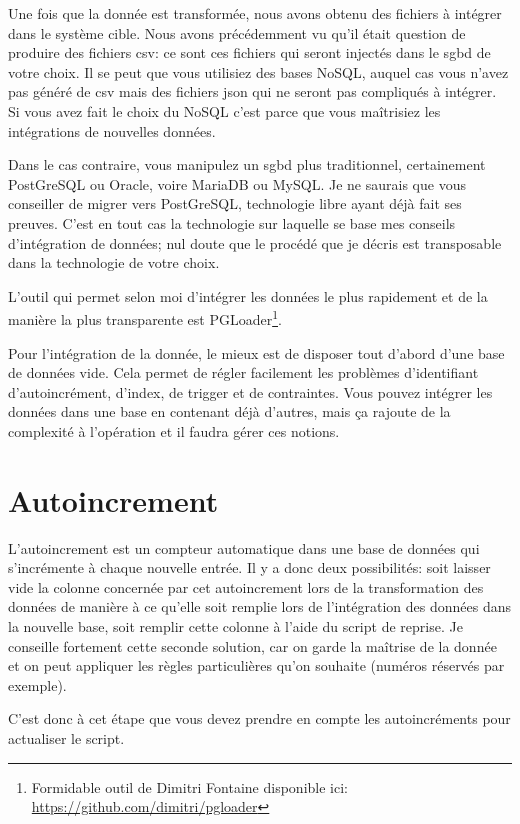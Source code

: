 \documentclass{book}
\begin{document}
Une fois que la donnée est transformée, nous avons obtenu des fichiers à intégrer dans le système cible. Nous avons précédemment vu qu'il était question de produire des fichiers \gls{csv}: ce sont ces fichiers qui seront injectés dans le \gls{sgbd} de votre choix. Il se peut que vous utilisiez des bases NoSQL, auquel cas vous n'avez pas généré de \gls{csv} mais des fichiers \gls{json} qui ne seront pas compliqués à intégrer. Si vous avez fait le choix du NoSQL c'est parce que vous maîtrisiez les intégrations de nouvelles données.

Dans le cas contraire, vous manipulez un \gls{sgbd} plus traditionnel, certainement PostGreSQL ou Oracle, voire MariaDB ou MySQL. Je ne saurais que vous conseiller de migrer vers PostGreSQL, technologie libre ayant déjà fait ses preuves. C'est en tout cas la technologie sur laquelle se base mes conseils d'intégration de données; nul doute que le procédé que je décris est transposable dans la technologie de votre choix.

L'outil qui permet selon moi d'intégrer les données le plus rapidement et de la manière la plus transparente est PGLoader\footnote{Formidable outil de Dimitri Fontaine disponible ici: \url{https://github.com/dimitri/pgloader}}.

Pour l'intégration de la donnée, le mieux est de disposer tout d'abord d'une base de données vide. Cela permet de régler facilement les problèmes d'identifiant d'autoincrément, d'index, de trigger et de contraintes. Vous pouvez intégrer les données dans une base en contenant déjà d'autres, mais ça rajoute de la complexité à l'opération et il faudra gérer ces notions.
	
\section{Autoincrement}

L'autoincrement est un compteur automatique dans une base de données qui s'incrémente à chaque nouvelle entrée. Il y a donc deux possibilités: soit laisser vide la colonne concernée par cet autoincrement lors de la transformation des données de manière à ce qu'elle soit remplie lors de l'intégration des données dans la nouvelle base, soit remplir cette colonne à l'aide du script de reprise. Je conseille fortement cette seconde solution, car on garde la maîtrise de la donnée et on peut appliquer les règles particulières qu'on souhaite (numéros réservés par exemple).

C'est donc à cet étape que vous devez prendre en compte les autoincréments pour actualiser le script.
	
\end{document}
